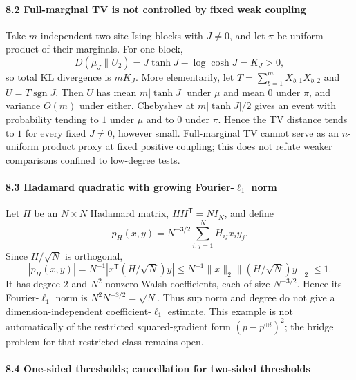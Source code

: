 \paragraph{8.2 Full-marginal TV is not controlled by fixed weak coupling}\label{full-marginal-tv-is-not-controlled-by-fixed-weak-coupling}

Take \(m\) independent two-site Ising blocks with \(J\ne0\), and let \(\pi\) be uniform product of their marginals. For one block,
\[D(\mu_J\|U_2)=J\tanh J-\log\cosh J=K_J>0,\]
so total KL divergence is \(mK_J\). More elementarily, let \(T=\sum_{b=1}^mX_{b,1}X_{b,2}\) and \(U=T\operatorname{sgn}J\). Then \(U\) has mean \(m|\tanh J|\) under \(\mu\) and mean \(0\) under \(\pi\), and variance \(O(m)\) under either. Chebyshev at \(m|\tanh J|/2\) gives an event with probability tending to \(1\) under \(\mu\) and to \(0\) under \(\pi\). Hence the TV distance tends to \(1\) for every fixed \(J\ne0\), however small. Full-marginal TV cannot serve as an \(n\)-uniform product proxy at fixed positive coupling; this does not refute weaker comparisons confined to low-degree tests.

\paragraph{\texorpdfstring{8.3 Hadamard quadratic with growing Fourier-\(\ell_1\) norm}{8.3 Hadamard quadratic with growing Fourier-\textbackslash ell\_1 norm}}\label{hadamard-quadratic-with-growing-fourier-ell_1-norm}

Let \(H\) be an \(N\times N\) Hadamard matrix, \(HH^{\mathsf T}=NI_N\), and define
\[p_H(x,y)=N^{-3/2}\sum_{i,j=1}^NH_{ij}x_iy_j.\]
Since \(H/\sqrt N\) is orthogonal,
\[|p_H(x,y)|=N^{-1}|x^{\mathsf T}(H/\sqrt N)y|
\le N^{-1}\|x\|_2\|(H/\sqrt N)y\|_2\le1.\]
It has degree \(2\) and \(N^2\) nonzero Walsh coefficients, each of size \(N^{-3/2}\). Hence its Fourier-\(\ell_1\) norm is \(N^2N^{-3/2}=\sqrt N\). Thus sup norm and degree do not give a dimension-independent coefficient-\(\ell_1\) estimate. This example is not automatically of the restricted squared-gradient form \((p-p^{\oplus i})^2\); the bridge problem for that restricted class remains open.

\paragraph{8.4 One-sided thresholds; cancellation for two-sided thresholds}\label{one-sided-thresholds-cancellation-for-two-sided-thresholds}


